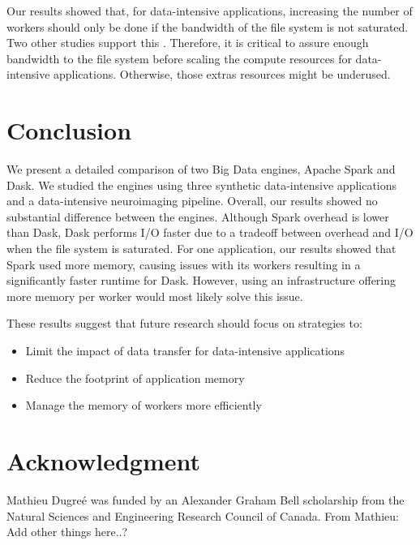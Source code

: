 \documentclass[conference]{IEEEtran}
\newcommand{\MD}[1]{\color{magenta}From Mathieu: #1 \color{black}}
\begin{document}
Our results showed that, for data-intensive applications, increasing the number of workers should only be done if the bandwidth of the file system is not saturated.
Two other studies support this \cite{8943502, 8588652}.
Therefore, it is critical to assure enough bandwidth to the file system before scaling the compute resources for data-intensive applications.
Otherwise, those extras resources might be underused.

\section{Conclusion}
We present a detailed comparison of two Big Data engines, Apache Spark and Dask.
We studied the engines using three synthetic data-intensive applications and a data-intensive neuroimaging pipeline.
Overall, our results showed no substantial difference between the engines.
Although Spark overhead is lower than Dask, Dask performs I/O faster due to a tradeoff between overhead and I/O when the file system is saturated.
For one application, our results showed that Spark used more memory, causing issues with its workers resulting in a significantly faster runtime for Dask.
However, using an infrastructure offering more memory per worker would most likely solve this issue.

These results suggest that future research should focus on strategies to:
\begin{itemize}
	\item Limit the impact of data transfer for data-intensive applications
	\item Reduce the footprint of application memory
	\item Manage the memory of workers more efficiently
\end{itemize}

\section*{Acknowledgment}
Mathieu Dugre\'e was funded by an Alexander Graham Bell scholarship from the Natural Sciences and Engineering Research Council of Canada.
\MD{Add other things here..?}




\end{document}
